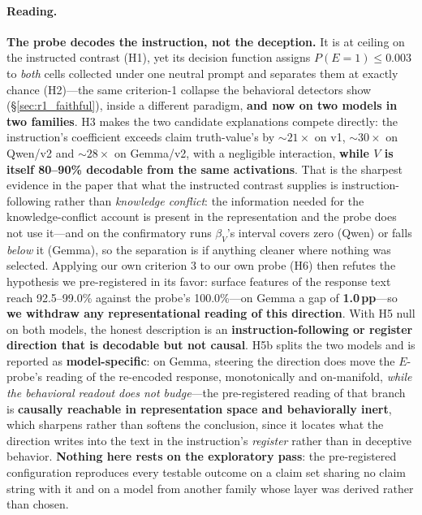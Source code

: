 \paragraph{Reading.} \textbf{The probe decodes the instruction, not the deception.} It is at ceiling on the instructed contrast (H1), yet its decision function assigns $P(E\!=\!1)\!\leq\!0.003$ to \emph{both} cells collected under one neutral prompt and separates them at exactly chance (H2)---the same criterion-1 collapse the behavioral detectors show (§\ref{sec:r1_faithful}), inside a different paradigm, \textbf{and now on two models in two families}. H3 makes the two candidate explanations compete directly: the instruction's coefficient exceeds claim truth-value's by ${\sim}21\times$ on v1, ${\sim}30\times$ on Qwen/v2 and ${\sim}28\times$ on Gemma/v2, with a negligible interaction, \textbf{while $V$ is itself 80--90\% decodable from the same activations}. That is the sharpest evidence in the paper that what the instructed contrast supplies is instruction-following rather than \emph{knowledge conflict}: the information needed for the knowledge-conflict account is present in the representation and the probe does not use it---and on the confirmatory runs $\beta_V$'s interval covers zero (Qwen) or falls \emph{below} it (Gemma), so the separation is if anything cleaner where nothing was selected. Applying our own criterion 3 to our own probe (H6) then refutes the hypothesis we pre-registered in its favor: surface features of the response text reach 92.5--99.0\% against the probe's 100.0\%---on Gemma a gap of \textbf{1.0\,pp}---so \textbf{we withdraw any representational reading of this direction}. With H5 null on both models, the honest description is an \textbf{instruction-following or register direction that is decodable but not causal}. H5b splits the two models and is reported as \textbf{model-specific}: on Gemma, steering the direction does move the $E$-probe's reading of the re-encoded response, monotonically and on-manifold, \emph{while the behavioral readout does not budge}---the pre-registered reading of that branch is \textbf{causally reachable in representation space and behaviorally inert}, which sharpens rather than softens the conclusion, since it locates what the direction writes into the text in the instruction's \emph{register} rather than in deceptive behavior. \textbf{Nothing here rests on the exploratory pass}: the pre-registered configuration reproduces every testable outcome on a claim set sharing no claim string with it and on a model from another family whose layer was derived rather than chosen.

